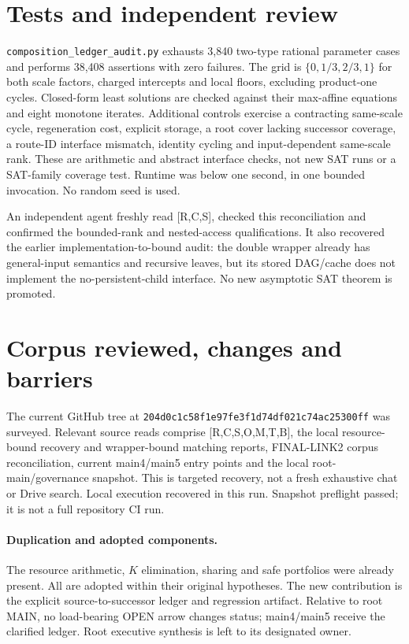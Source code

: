 \documentclass[11pt]{article}
\begin{document}
\section{Tests and independent review}
\texttt{composition\_ledger\_audit.py} exhausts 3,840 two-type rational
parameter cases and performs 38,408 assertions with zero failures.
The grid is $\{0,1/3,2/3,1\}$ for both scale factors, charged intercepts
and local floors, excluding product-one cycles. Closed-form least solutions
are checked against their max-affine equations and eight monotone iterates.
Additional controls exercise a contracting same-scale cycle, regeneration
cost, explicit storage, a root cover lacking successor coverage, a route-ID
interface mismatch, identity cycling and input-dependent same-scale rank.
These are arithmetic and abstract interface checks, not new SAT runs or a
SAT-family coverage test. Runtime was below one second, in one bounded
invocation. No random seed is used.

An independent agent freshly read [R,C,S], checked this reconciliation and
confirmed the bounded-rank and nested-access qualifications. It also
recovered the earlier implementation-to-bound audit: the double wrapper
already has general-input semantics and recursive leaves, but its stored
DAG/cache does not implement the no-persistent-child interface. No new
asymptotic SAT theorem is promoted.

\section{Corpus reviewed, changes and barriers}
The current GitHub tree at \texttt{204d0c1c58f1e97fe3f1d74df021c74ac25300ff}
was surveyed. Relevant source reads comprise [R,C,S,O,M,T,B], the local
resource-bound recovery and wrapper-bound matching reports, FINAL-LINK2
corpus reconciliation, current main4/main5 entry points and the local
root-main/governance snapshot. This is targeted recovery, not a fresh
exhaustive chat or Drive search. Local execution recovered in this run.
Snapshot preflight passed; it is not a full repository CI run.

\paragraph{Duplication and adopted components.}
The resource arithmetic, $K$ elimination, sharing and safe portfolios were
already present. All are adopted within their original hypotheses. The
new contribution is the explicit source-to-successor ledger and regression
artifact. Relative to root MAIN, no load-bearing OPEN arrow changes status;
main4/main5 receive the clarified ledger. Root executive synthesis is left
to its designated owner.
\end{document}
